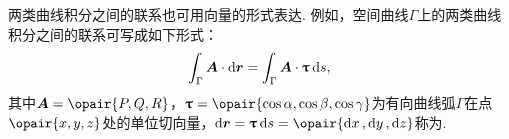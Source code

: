 两类曲线积分之间的联系也可用向量的形式表达.
例如，空间曲线\(\Gamma\)上的两类曲线积分之间的联系可写成如下形式：
\begin{equation}\label{equation:线积分与面积分.空间曲线上两类曲线积分之间的联系的向量形式}
\int_{\Gamma}{\boldsymbol{A} \cdot \dd{\boldsymbol{r}}}
= \int_{\Gamma}{\boldsymbol{A} \cdot \boldsymbol{\uptau} \dd{s}},
\end{equation}其中\(\mat{A}=\opair{P,Q,R}\)，\(\mat{\tau}=\opair{\cos\alpha,\cos\beta,\cos\gamma}\)为有向曲线弧\(\Gamma\)在点\(\opair{x,y,z}\)处的单位切向量，\(\dd{\mat{r}}=\mat{\tau}\dd{s}=\opair{\dd{x},\dd{y},\dd{z}}\)称为.
